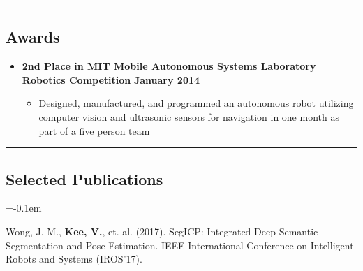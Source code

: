 \documentclass[10pt,letterpaper]{article}
\begin{document}
\hrule
\vspace{-0.6em}

\subsection*{Awards}
  \begin{itemize}
    \parskip=-0.1em
    
    \item[]
    {\href{http://maslab.mit.edu/2014/site/index.html}{\textbf{2nd Place in MIT Mobile Autonomous Systems Laboratory Robotics Competition}} \hfill
      \textbf{January 2014}}

    \begin{itemize}[label=\textbullet]
      \itemsep0em
      \item Designed, manufactured, and programmed an autonomous robot utilizing computer vision and ultrasonic sensors for navigation in one month as part of a five person team
      \end{itemize}    
\end{itemize}

\hrule
\vspace{-0.6em}

\subsection*{Selected Publications}
    \parskip=-0.1em

Wong, J. M., \textbf{Kee, V.}, et. al. (2017). SegICP: Integrated Deep Semantic Segmentation and Pose Estimation. IEEE International Conference on Intelligent Robots and Systems (IROS'17).

\end{document}
